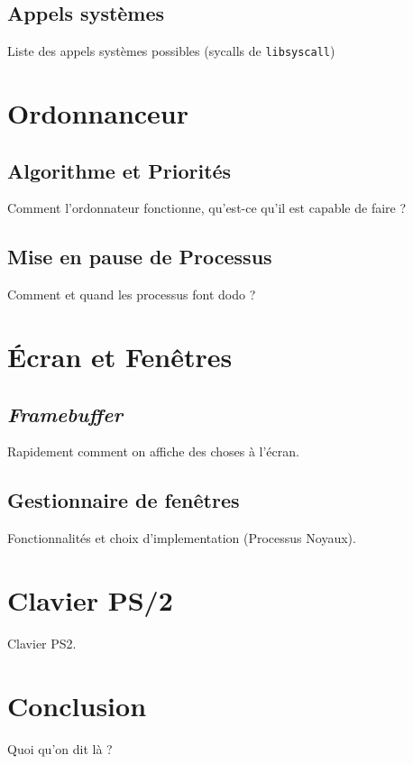 \documentclass[french, 12pt]{article}
\begin{document}
\subsection{Appels systèmes}
Liste des appels systèmes possibles (sycalls de \texttt{libsyscall})

\section{Ordonnanceur}
\subsection{Algorithme et Priorités}
Comment l'ordonnateur fonctionne, qu'est-ce qu'il est capable de faire ?

\subsection{Mise en pause de Processus}
Comment et quand les processus font dodo ?

\section{Écran et Fenêtres}
\subsection{\textit{Framebuffer}}
Rapidement comment on affiche des choses à l'écran.

\subsection{Gestionnaire de fenêtres}
Fonctionnalités et choix d'implementation (Processus Noyaux).

\section{Clavier PS/2}
Clavier PS2.

\section{Conclusion}
Quoi qu'on dit là ?
\end{document}
